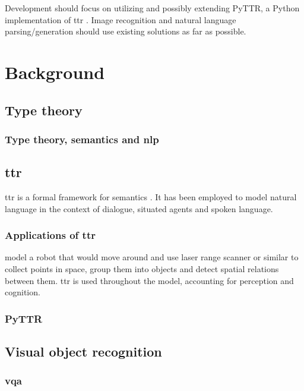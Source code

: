 \documentclass[11pt, a4paper]{article}
\begin{document}
\noindent
Development should focus on utilizing and possibly extending PyTTR, a Python implementation of \gls{ttr} \citep{pyttr}. Image recognition and natural language parsing/generation should use existing solutions as far as possible.

\section{Background}

\subsection{Type theory}

\subsubsection{Type theory, semantics and \gls{nlp}}

\subsection{\Gls{ttr}}

\gls{ttr} is a formal framework for semantics \citep{CooperRecordsRecordTypes2005}.
It has been employed to model natural language in the context of dialogue, situated agents and spoken language.

\subsubsection{Applications of \gls{ttr}}

\cite{DobnikModellinglanguageaction2012} model a robot that would move around and use laser range scanner or similar to collect points in space, group them into objects and detect spatial relations between them.
\Gls{ttr} is used throughout the model, accounting for perception and cognition.

\subsubsection{PyTTR}

\subsection{Visual object recognition}

\cite{Detectron2018}

\subsubsection{\Gls{vqa}}
\end{document}
